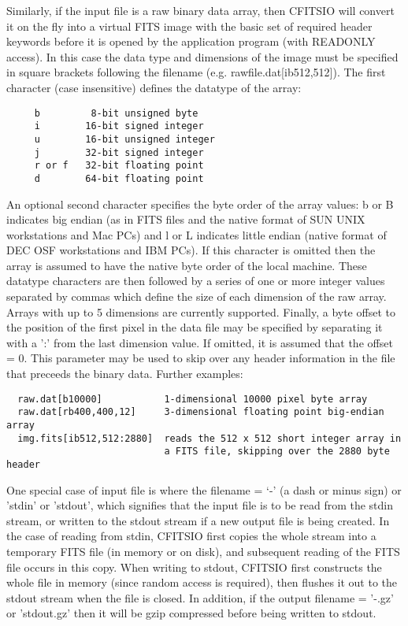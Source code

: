 \documentclass[11pt]{book}
\begin{document}
Similarly, if the input file is a raw binary data array, then CFITSIO
will convert it on the fly into a virtual FITS image with the basic set
of required header keywords before it is opened by the application
program (with READONLY access).  In this case the data type and
dimensions of the image must be specified in square brackets following
the filename (e.g. rawfile.dat[ib512,512]). The first character (case
insensitive) defines the datatype of the array:

\begin{verbatim}
     b         8-bit unsigned byte
     i        16-bit signed integer
     u        16-bit unsigned integer
     j        32-bit signed integer
     r or f   32-bit floating point
     d        64-bit floating point
\end{verbatim}
An optional second character specifies the byte order of the array
values: b or B indicates big endian (as in FITS files and the native
format of SUN UNIX workstations and Mac PCs) and l or L indicates
little endian (native format of DEC OSF workstations and IBM PCs).  If
this character is omitted then the array is assumed to have the native
byte order of the local machine.  These datatype characters are then
followed by a series of one or more integer values separated by commas
which define the size of each dimension of the raw array.  Arrays with
up to 5 dimensions are currently supported.  Finally, a byte offset to
the position of the first pixel in the data file may be specified by
separating it with a ':' from the last dimension value.  If omitted, it
is assumed that the offset = 0.  This parameter may be used to skip
over any header information in the file that preceeds the binary data.
Further examples:

\begin{verbatim}
  raw.dat[b10000]           1-dimensional 10000 pixel byte array
  raw.dat[rb400,400,12]     3-dimensional floating point big-endian array
  img.fits[ib512,512:2880]  reads the 512 x 512 short integer array in
                            a FITS file, skipping over the 2880 byte header
\end{verbatim}

One special case of input file is where the filename = `-' (a dash or
minus sign) or 'stdin' or 'stdout', which signifies that the input file
is to be read from the stdin stream, or written to the stdout stream if
a new output file is being created.  In the case of reading from stdin,
CFITSIO first copies the whole stream into a temporary FITS file (in
memory or on disk), and subsequent reading of the FITS file occurs in
this copy.  When writing to stdout, CFITSIO first constructs the whole
file in memory (since random access is required), then flushes it out
to the stdout stream when the file is closed.   In addition, if the
output filename = '-.gz' or 'stdout.gz' then it will be gzip compressed
before being written to stdout.
\end{document}
